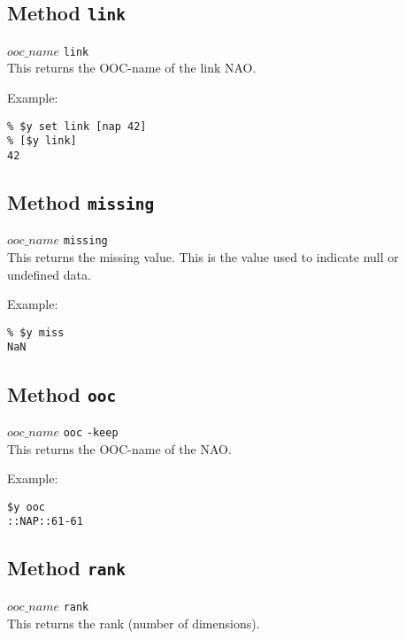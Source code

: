   \subsection{
    \label{link}Method \texttt{link}
  }

  


  $ooc\_name$ 
  \texttt{link}
  \\
  

This returns the OOC-name of the link NAO.
  

Example:
  \begin{verbatim}
% $y set link [nap 42]
% [$y link]
42
\end{verbatim}

  \subsection{
    \label{missing}Method \texttt{missing}
  }

  


  $ooc\_name$ 
  \texttt{missing}
  \\
  

This returns the missing value. This is the value used to indicate
  null or undefined data.
  

Example:
  \begin{verbatim}
% $y miss
NaN
\end{verbatim}

  \subsection{
    \label{ooc}Method \texttt{ooc}
  }

  


  $ooc\_name$ 
  \texttt{ooc} 
  \texttt{-keep}
  \\
  

This returns the OOC-name of the NAO.
  

Example:
  \begin{verbatim}
$y ooc
::NAP::61-61
\end{verbatim}

  \subsection{
    \label{rank}Method \texttt{rank}
  }

  


  $ooc\_name$ 
  \texttt{rank}
  \\
  

This returns the rank (number of dimensions).
  

